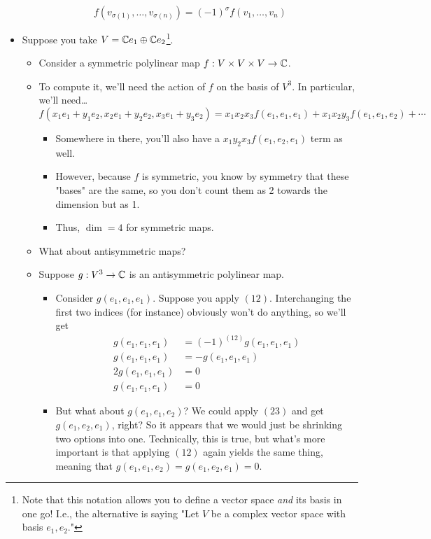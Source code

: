 \documentclass[../notes.tex]{subfiles}
\begin{document}
\begin{itemize}
\begin{equation*}
        f(v_{\sigma(1)},\dots,v_{\sigma(n)}) = (-1)^\sigma f(v_1,\dots,v_n)
    \end{equation*}
    \item Suppose you take $V=\mathbb{C} e_1\oplus\mathbb{C} e_2$\footnote{Note that this notation allows you to define a vector space \emph{and} its basis in one go! I.e., the alternative is saying "Let $V$ be a complex vector space with basis $e_1,e_2$."}.
    \begin{itemize}
        \item Consider a symmetric polylinear map $f:V\times V\times V\to\mathbb{C}$.
        \item To compute it, we'll need the action of $f$ on the basis of $V^3$. In particular, we'll need\dots
        \begin{equation*}
            f(x_1e_1+y_1e_2,x_2e_1+y_2e_2,x_3e_1+y_3e_2) = x_1x_2x_3f(e_1,e_1,e_1)+x_1x_2y_3f(e_1,e_1,e_2)+\cdots
        \end{equation*}
        \begin{itemize}
            \item Somewhere in there, you'll also have a $x_1y_2x_3f(e_1,e_2,e_1)$ term as well.
            \item However, because $f$ is symmetric, you know by symmetry that these "bases" are the same, so you don't count them as 2 towards the dimension but as 1.
            \item Thus, $\dim=4$ for symmetric maps.
        \end{itemize}
        \item What about antisymmetric maps?
        \item Suppose $g:V^3\to\mathbb{C}$ is an antisymmetric polylinear map.
        \begin{itemize}
            \item Consider $g(e_1,e_1,e_1)$. Suppose you apply $(12)$. Interchanging the first two indices (for instance) obviously won't do anything, so we'll get
            \begin{align*}
                g(e_1,e_1,e_1) &= (-1)^{(12)}g(e_1,e_1,e_1)\\
                g(e_1,e_1,e_1) &= -g(e_1,e_1,e_1)\\
                2g(e_1,e_1,e_1) &= 0\\
                g(e_1,e_1,e_1) &= 0
            \end{align*}
            \item But what about $g(e_1,e_1,e_2)$? We could apply $(23)$ and get $g(e_1,e_2,e_1)$, right? So it appears that we would just be shrinking two options into one. Technically, this is true, but what's more important is that applying $(12)$ again yields the same thing, meaning that $g(e_1,e_1,e_2)=g(e_1,e_2,e_1)=0$.

\end{itemize}
\end{itemize}
\end{itemize}
\end{document}
